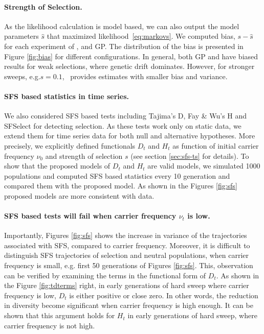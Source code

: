 \documentclass[11pt]{article}
\def\comale{\text{COMALE }}
\begin{document}
\paragraph{Strength of Selection.}
As the likelihood calculation is model based, we can also output the
model parameters $\hat{s}$ that maximized
likelihood~\eqref{eq:markovs}.  We computed bias, $s-\hat{s}$ for each
experiment of \comale, and GP. The distribution of the bias is
presented in Figure \ref{fig:bias} for different configurations. In
general, both GP and \comale have biased results for weak selections,
where genetic drift dominates. However, for stronger sweeps,
e.g.$s=0.1$, \comale\ provides estimates with smaller bias and
variance.


\paragraph{SFS based statistics in time series.} 
We also considered SFS based tests including Tajima's D, Fay \& Wu's H and 
SFSelect for detecting selection. 
As these tests work only on static data, we extend them for time series data 
for both null and alternative hypotheses.
More precisely, we explicitly defined functionals $D_t$ and $H_t$ as function 
of initial carrier frequency $\nu_0$ and strength of selection $s$ (see section 
\ref{sec:sfs-ts} for details).
 To show that the proposed models of $D_t$ and $H_t$ are valid models, we 
 simulated 1000 populations and computed SFS based statistics every 10 
 generation and compared them with the proposed model.
 As shown in the Figures \ref{fig:sfs} proposed models are more consistent with data.

\paragraph{SFS based tests will fail when carrier frequency $\nu_t$ is low.}
Importantly,  Figures \ref{fig:sfs} shows the increase in variance of the trajectories associated with SFS, compared to carrier frequency. Moreover, it is difficult to distinguish SFS trajectories of selection and neutral populations, when carrier frequency is small, e.g. first 50 generations of Figures \ref{fig:sfs}.
This, observation can be verified by examining the terms in the functional form of $D_t$.
As shown in the Figure 
\ref{fig:tdterms} right, in early 
generations of hard sweep where carrier frequency is low, 
$D_t$ is either 
positive or close zero. In other words, the reduction in 
diversity become 
significant when carrier frequency is high enough.
It can be shown that this argument holds for $H_t$ in early generations 
of hard sweep, where carrier frequency is not high.
\end{document}
